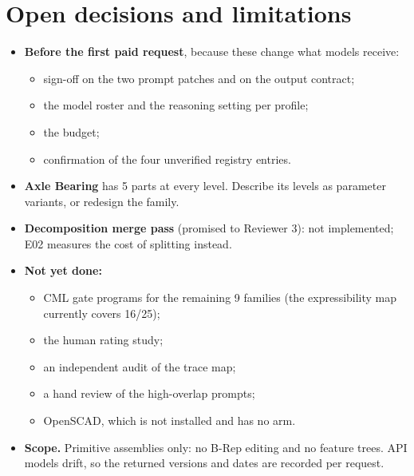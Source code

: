 \documentclass[10pt,a4paper]{article}
\begin{document}
\section{Open decisions and limitations}
\begin{itemize}
\item \textbf{Before the first paid request}, because these change what models receive:
  \begin{itemize}
  \item sign-off on the two prompt patches and on the output contract;
  \item the model roster and the reasoning setting per profile;
  \item the budget;
  \item confirmation of the four unverified registry entries.
  \end{itemize}
\item \textbf{Axle Bearing} has 5 parts at every level. Describe its levels as parameter variants, or redesign the family.
\item \textbf{Decomposition merge pass} (promised to Reviewer 3): not implemented; E02 measures the cost of splitting instead.
\item \textbf{Not yet done:}
  \begin{itemize}
  \item CML gate programs for the remaining 9 families (the expressibility map currently covers 16/25);
  \item the human rating study;
  \item an independent audit of the trace map;
  \item a hand review of the high-overlap prompts;
  \item OpenSCAD, which is not installed and has no arm.
  \end{itemize}
\item \textbf{Scope.} Primitive assemblies only: no B-Rep editing and no feature trees. API models drift, so the returned versions and dates are recorded per request.
\end{itemize}
\end{document}
